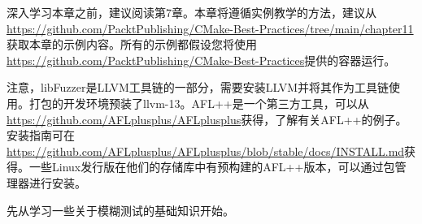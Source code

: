 深入学习本章之前，建议阅读第7章。本章将遵循实例教学的方法，建议从\url{https://github.com/PacktPublishing/CMake-Best-Practices/tree/main/chapter11}获取本章的示例内容。所有的示例都假设您将使用\url{https://github.com/PacktPublishing/CMake-Best-Practices}提供的容器运行。

注意，libFuzzer是LLVM工具链的一部分，需要安装LLVM并将其作为工具链使用。打包的开发环境预装了llvm-13。AFL++是一个第三方工具，可以从\url{https://github.com/AFLplusplus/AFLplusplus}获得，了解有关AFL++的例子。安装指南可在\url{https://github.com/AFLplusplus/AFLplusplus/blob/stable/docs/INSTALL.md}获得。一些Linux发行版在他们的存储库中有预构建的AFL++版本，可以通过包管理器进行安装。

先从学习一些关于模糊测试的基础知识开始。